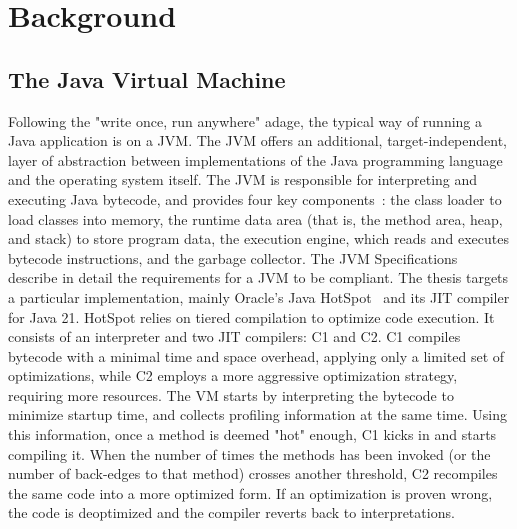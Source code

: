 \chapter{Background}


\section{The Java Virtual Machine}
Following the "write once, run anywhere" adage, the typical way of running a Java application is on a JVM.
The JVM offers an additional, target-independent, layer of abstraction between implementations of the Java programming language and the operating system itself.
The JVM is responsible for interpreting and executing Java bytecode, and provides four key components~\cite{dannarapu_jvm_2023-1}: 
the class loader to load classes into memory, the runtime data area (that is, the method area, heap, and stack) to store program data, the execution engine, which reads and executes bytecode instructions, and the garbage collector. The JVM Specifications~\cite{noauthor_java_nodate-1} describe in detail the requirements for a JVM to be compliant. 
The thesis targets a particular implementation, mainly Oracle's Java HotSpot~\cite{noauthor_hotspot_nodate} and its JIT compiler for Java 21. 
HotSpot relies on tiered compilation to optimize code execution. It consists of an interpreter and two JIT compilers: C1 and C2. 
C1 compiles bytecode with a minimal time and space overhead, applying only a limited set of optimizations, while C2 employs a more aggressive optimization strategy, requiring more resources.
The VM starts by interpreting the bytecode to minimize startup time, and collects profiling information at the same time. Using this information, once a method is deemed "hot" enough, C1 kicks in and starts compiling it. When the number of times the methods has been invoked (or the number of back-edges to that method) crosses another threshold, C2 recompiles the same code into a more optimized form. If an optimization is proven wrong, the code is deoptimized and the compiler reverts back to interpretations.  

